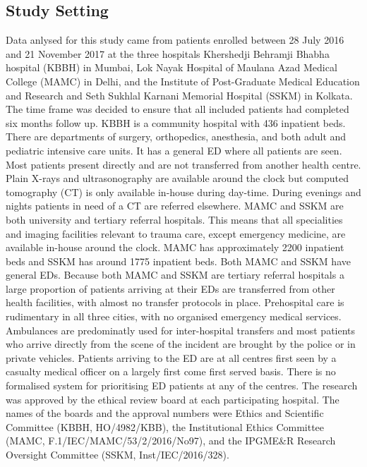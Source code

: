 \documentclass[10pt,letterpaper]{article}\usepackage[]{graphicx}\usepackage[]{color}
\begin{document}
\subsection*{Study Setting}
Data anlysed for this study came from patients enrolled between 28 July 2016 and
21 November 2017 at the three hospitals Khershedji Behramji Bhabha hospital
(KBBH) in Mumbai, Lok Nayak Hospital of Maulana Azad Medical College (MAMC) in
Delhi, and the Institute of Post-Graduate Medical Education and Research and
Seth Sukhlal Karnani Memorial Hospital (SSKM) in Kolkata. The time frame was
decided to ensure that all included patients had completed six months follow
up. KBBH is a community hospital with 436 inpatient beds. There are departments
of surgery, orthopedics, anesthesia, and both adult and pediatric intensive care
units. It has a general ED where all patients are seen. Most patients present
directly and are not transferred from another health centre. Plain X-rays and
ultrasonography are available around the clock but computed tomography (CT) is
only available in-house during day-time. During evenings and nights patients in
need of a CT are referred elsewhere. MAMC and SSKM are both university and
tertiary referral hospitals. This means that all specialities and imaging
facilities relevant to trauma care, except emergency medicine, are available
in-house around the clock. MAMC has approximately 2200 inpatient beds and SSKM
has around 1775 inpatient beds. Both MAMC and SSKM have general EDs. Because
both MAMC and SSKM are tertiary referral hospitals a large proportion of
patients arriving at their EDs are transferred from other health facilities,
with almost no transfer protocols in place. Prehospital care is rudimentary in
all three cities, with no organised emergency medical services. Ambulances are
predominatly used for inter-hospital transfers and most patients who arrive
directly from the scene of the incident are brought by the police or in private
vehicles. Patients arriving to the ED are at all centres first seen by a
casualty medical officer on a largely first come first served basis. There is no
formalised system for prioritising ED patients at any of the centres. The
research was approved by the ethical review board at each participating
hospital. The names of the boards and the approval numbers were Ethics and
Scientific Committee (KBBH, HO/4982/KBB), the Institutional Ethics Committee
(MAMC, F.1/IEC/MAMC/53/2/2016/No97), and the IPGME\&R Research Oversight
Committee (SSKM, Inst/IEC/2016/328).

\end{document}
